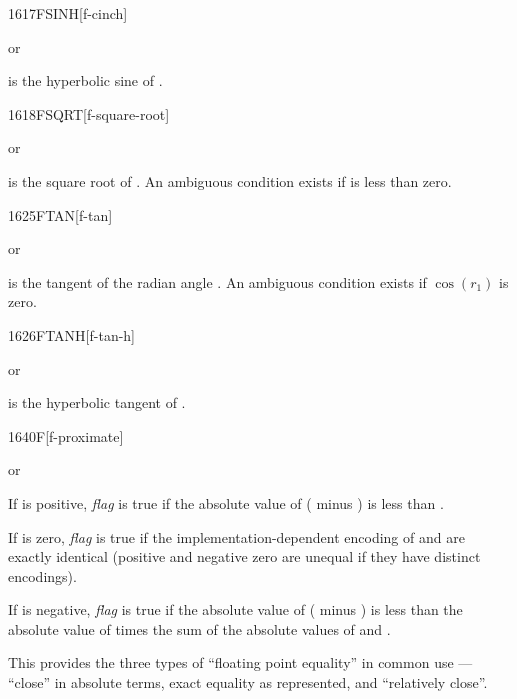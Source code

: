 \begin{worddef}{1617}{FSINH}[f-cinch]
\item {} or

	 is the hyperbolic sine of .
\end{worddef}


\begin{worddef}{1618}{FSQRT}[f-square-root]
\item {} or

	 is the square root of . An ambiguous
	condition exists if  is less than zero.
\end{worddef}


\begin{worddef}{1625}{FTAN}[f-tan]
\item {} or

	 is the tangent of the radian angle . An
	ambiguous condition exists if $\cos(r_1)$ is zero.
\end{worddef}


\begin{worddef}{1626}{FTANH}[f-tan-h]
\item {} or

	 is the hyperbolic tangent of .
\end{worddef}


\begin{worddef}[Ftilde]{1640}{F\tilde}[f-proximate]
\item {}  or

	If  is positive, \emph{flag} is true if the absolute
	value of ( minus ) is less than .

	If  is zero, \emph{flag} is true if the
	implementation-dependent encoding of  and 
	are exactly identical (positive and negative zero are unequal if
	they have distinct encodings).

	If  is negative, \emph{flag} is true if the absolute value
	of ( minus ) is less than the absolute value of
	 times the sum of the absolute values of  and
	.

	\begin{rationale} %
		This provides the three types of ``floating point equality''
		in common use --- ``close'' in absolute terms, exact equality
		as represented, and ``relatively close''.
	\end{rationale}
\end{worddef}


